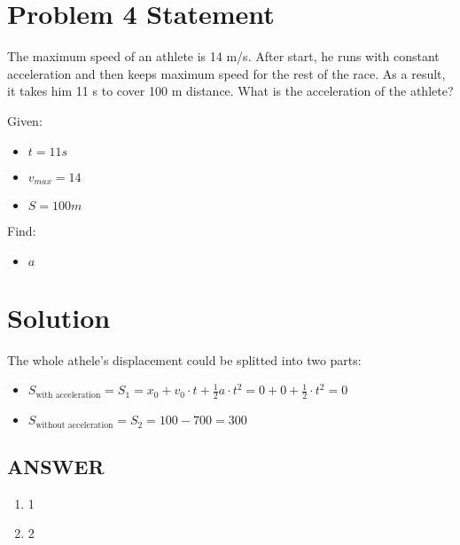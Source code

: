 \section*{Problem 4 Statement}

The maximum speed of an athlete is 14 m/s. After start, he runs with constant acceleration and
then keeps maximum speed for the rest of the race. As a result, it takes him 11 s to cover 100 m
distance. What is the acceleration of the athlete?

\bigbreak Given:

\begin{itemize}
    \item $t = 11s$
    \item $v_{max} = 14$
    \item $S = 100m$
\end{itemize}

\bigbreak Find:

\begin{itemize}
    \item $a$
\end{itemize}

\section*{Solution}

The whole athele's displacement could be splitted into two parts:

\begin{itemize}
    \item $S_{\text{with acceleration}} = S_1 = x_0 + v_0 \cdot t + \frac{1}{2} a \cdot t^2 = 0 + 0 + \frac{1}{2} \cdot t^2 = 0$
    \item $ S_{\text{without acceleration}} = S_2 = 100 - 700 = 300$
\end{itemize}

\vfill \subsection*{ANSWER}
\begin{enumerate}
    \item 1
    \item 2
\end{enumerate}
